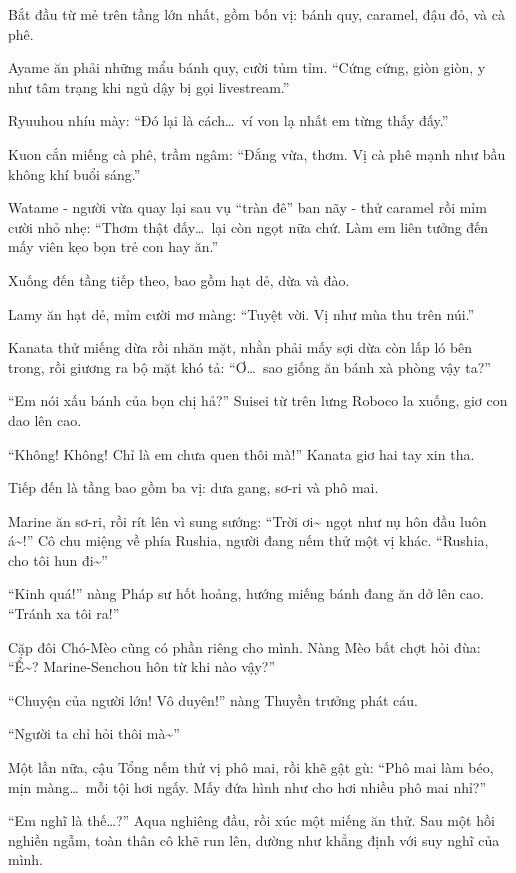 \documentclass[../main.tex]{subfiles}
\begin{document}
Bắt đầu từ mẻ trên tầng lớn nhất, gồm bốn vị: bánh quy, caramel, đậu đỏ, và cà phê.

Ayame ăn phải những mẩu bánh quy, cười tủm tỉm. ``Cứng cứng, giòn giòn, y như tâm trạng khi ngủ dậy bị gọi livestream.''

Ryuuhou nhíu mày: ``Đó lại là cách\dots\ ví von lạ nhất em từng thấy đấy.''

Kuon cắn miếng cà phê, trầm ngâm: ``Đắng vừa, thơm. Vị cà phê mạnh như bầu không khí buổi sáng.''

Watame - người vừa quay lại sau vụ ``tràn đê'' ban nãy - thử caramel rồi mỉm cười nhỏ nhẹ: ``Thơm thật đấy\dots\ lại còn ngọt nữa chứ. Làm em liên tưởng đến mấy viên kẹo bọn trẻ con hay ăn.''

Xuống đến tầng tiếp theo, bao gồm hạt dẻ, dừa và đào.

Lamy ăn hạt dẻ, mỉm cười mơ màng: ``Tuyệt vời. Vị như mùa thu trên núi.''

Kanata thử miếng dừa rồi nhăn mặt, nhằn phải mấy sợi dừa còn lấp ló bên trong, rồi giương ra bộ mặt khó tả: ``Ơ\dots\ sao giống ăn bánh xà phòng vậy ta?''

``Em nói xấu bánh của bọn chị hả?'' Suisei từ trên lưng Roboco la xuống, giơ con dao lên cao.

``Không! Không! Chỉ là em chưa quen thôi mà!'' Kanata giơ hai tay xin tha.

Tiếp đến là tầng bao gồm ba vị: dưa gang, sơ-ri và phô mai.

Marine ăn sơ-ri, rồi rít lên vì sung sướng: ``Trời ơi\~{} ngọt như nụ hôn đầu luôn á\~{}!'' Cô chu miệng về phía Rushia, người đang nếm thử một vị khác. ``Rushia, cho tôi hun đi\~{}''

``Kinh quá!'' nàng Pháp sư hốt hoảng, hướng miếng bánh đang ăn dở lên cao. ``Tránh xa tôi ra!''

Cặp đôi Chó-Mèo cũng có phần riêng cho mình. Nàng Mèo bất chợt hỏi đùa: ``Ể\~{}? Marine-Senchou hôn từ khi nào vậy?''

``Chuyện của người lớn! Vô duyên!'' nàng Thuyền trưởng phát cáu.

``Người ta chỉ hỏi thôi mà\~{}''

Một lần nữa, cậu Tổng nếm thử vị phô mai, rồi khẽ gật gù: ``Phô mai làm béo, mịn màng\dots\ mỗi tội hơi ngấy. Mấy đứa hình như cho hơi nhiều phô mai nhỉ?''

``Em nghĩ là thế\dots?'' Aqua nghiêng đầu, rồi xúc một miếng ăn thử. Sau một hồi nghiền ngẫm, toàn thân cô khẽ run lên, dường như khẳng định với suy nghĩ của mình.
\end{document}
